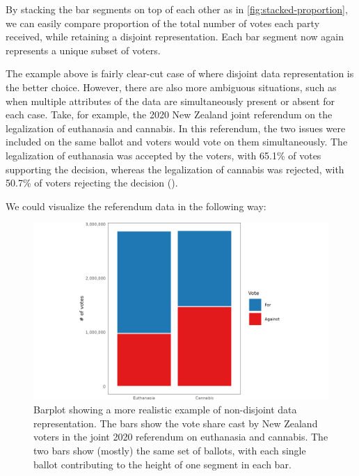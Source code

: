 \documentclass[
]{book}
\theoremstyle{definition}
\theoremstyle{definition}
\theoremstyle{definition}
\theoremstyle{definition}
\theoremstyle{remark}
\begin{document}
By stacking the bar segments on top of each other as in \ref{fig:stacked-proportion}, we can easily compare proportion of the total number of votes each party received, while retaining a disjoint representation. Each bar segment now again represents a unique subset of voters.

The example above is fairly clear-cut case of where disjoint data representation is the better choice. However, there are also more ambiguous situations, such as when multiple attributes of the data are simultaneously present or absent for each case. Take, for example, the 2020 New Zealand joint referendum on the legalization of euthanasia and cannabis. In this referendum, the two issues were included on the same ballot and voters would vote on them simultaneously. The legalization of euthanasia was accepted by the voters, with 65.1\% of votes supporting the decision, whereas the legalization of cannabis was rejected, with 50.7\% of voters rejecting the decision ().

We could visualize the referendum data in the following way:

\begin{figure}

{\centering \includegraphics[width=1\linewidth,height=1\textheight]{./figures/referendum-notbijection} 

}

\caption{Barplot showing a more realistic example of non-disjoint data representation. The bars show the vote share cast by New Zealand voters in the joint 2020 referendum on euthanasia and cannabis. The two bars show (mostly) the same set of ballots, with each single ballot contributing to the height of one segment in each bar.}\label{fig:union-geoms2}
\end{figure}
\end{document}
